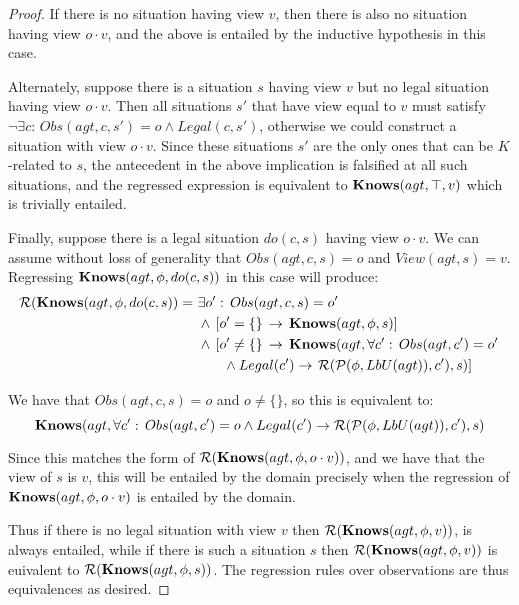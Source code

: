 \begin{proof}
If there is no situation having view $v$, then there is also no situation
having view $o\cdot v$, and the above is entailed by the inductive
hypothesis in this case. 

Alternately, suppose there is a situation $s$ having view $v$ but
no legal situation having view $o\cdot v$. Then all situations $s'$
that have view equal to $v$ must satisfy $\neg\exists c:\, Obs(agt,c,s')=o\wedge Legal(c,s')$,
otherwise we could construct a situation with view $o\cdot v$. Since
these situations $s'$ are the only ones that can be $K$-related
to $s$, the antecedent in the above implication is falsified at all
such situations, and the regressed expression is equivalent to $\mathbf{Knows}(agt,\top,v)$
which is trivially entailed.

Finally, suppose there is a legal situation $do(c,s)$ having view
$o\cdot v$. We can assume without loss of generality that $Obs(agt,c,s)=o$
and $View(agt,s)=v$. Regressing $\mathbf{Knows}(agt,\phi,do(c,s))$ in this
case will produce:\begin{alignat*}{1}
\mathcal{R}(\mathbf{Knows}(agt,\phi,do(c,s))=\,\, & \exists o':\, Obs(agt,c,s)=o'\\
 & \wedge\,\left[o'=\{\}\,\rightarrow\,\mathbf{Knows}(agt,\phi,s)\right]\\
 & \wedge\,\left[o'\neq\{\}\,\rightarrow\,\mathbf{Knows}(agt,\forall c':\, Obs(agt,c')=o'\right.\\
 & \,\,\,\,\,\,\,\,\,\,\,\wedge Legal(c')\rightarrow\left.\mathcal{R}(\mathcal{P}(\phi,LbU(agt)),c'),s)\right]\end{alignat*}


We have that $Obs(agt,c,s)=o$ and $o\neq\{\}$, so this is equivalent
to:\[
\mathbf{Knows}(agt,\forall c':\, Obs(agt,c')=o\wedge Legal(c')\rightarrow\mathcal{R}(\mathcal{P}(\phi,LbU(agt)),c'),s)\]


Since this matches the form of $\mathcal{R}(\mathbf{Knows}(agt,\phi,o\cdot v))$,
and we have that the view of $s$ is $v$, this will be entailed by
the domain precisely when the regression of $\mathbf{Knows}(agt,\phi,o\cdot v)$
is entailed by the domain.

Thus if there is no legal situation with view $v$ then $\mathcal{R}(\mathbf{Knows}(agt,\phi,v))$,
is always entailed, while if there is such a situation $s$ then $\mathcal{R}(\mathbf{Knows}(agt,\phi,v))$
is euivalent to $\mathcal{R}(\mathbf{Knows}(agt,\phi,s))$. The regression rules
over observations are thus equivalences as desired.
\end{proof}
\medskip{}


